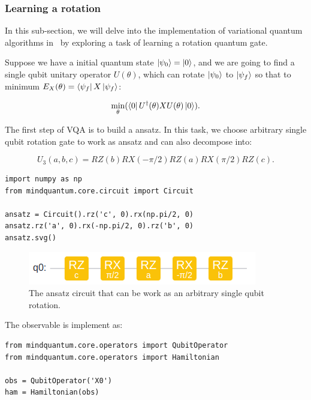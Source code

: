 \subsubsection{Learning a rotation}

In this sub-section, we will delve into the implementation of variational quantum algorithms in \MindQuantum\ by exploring a task of learning a rotation quantum gate.

Suppose we have a initial quantum state $\ket{\psi_0}=\ket{0}$, and we are going to find a single qubit unitary operator $U(\theta)$, which can rotate $\ket{\psi_0}$ to $\ket{\psi_f}$ so that to minimum $E_X(\theta) = \bra{\psi_f}X\ket{\psi_f}$:

\begin{equation}
  \min_\theta(\bra{0}U^\dagger(\theta)XU(\theta)\ket{0}).
\end{equation}

The first step of VQA is to build a ansatz. In this task, we choose arbitrary single qubit rotation gate \Uthree to work as ansatz and \Uthree can also decompose into:

\begin{equation}
  U_3(a, b, c) = RZ(b)RX(-\pi/2)RZ(a)RX(\pi/2)RZ(c).
\end{equation}

\begin{lstlisting}
import numpy as np
from mindquantum.core.circuit import Circuit

ansatz = Circuit().rz('c', 0).rx(np.pi/2, 0)
ansatz.rz('a', 0).rx(-np.pi/2, 0).rz('b', 0)
ansatz.svg()
\end{lstlisting}

\begin{figure}[h]
  \begin{center}
    \includegraphics[width=0.9\linewidth]{images/3_1_ansatz.png}
  \end{center}
  \caption{The ansatz circuit that can be work as an arbitrary single qubit rotation.}
  \label{fig:u3_ansatz}
\end{figure}

The observable is implement as:

\begin{lstlisting}
from mindquantum.core.operators import QubitOperator
from mindquantum.core.operators import Hamiltonian

obs = QubitOperator('X0')
ham = Hamiltonian(obs)
\end{lstlisting}


